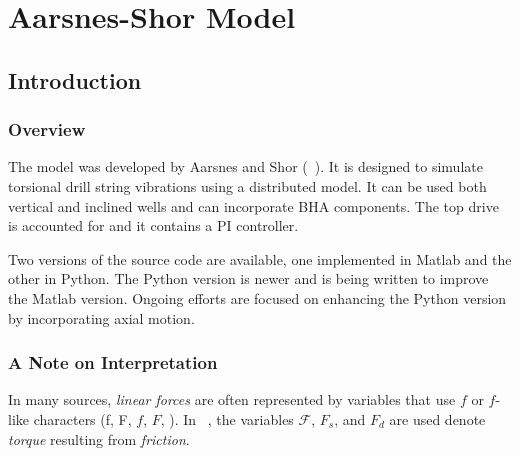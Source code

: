 \chapter{Aarsnes-Shor Model}
\label{ch:aarnessshormodel}

\section{Introduction}
\subsection{Overview}
The model was developed by Aarsnes and Shor (~\cite{ref:aarsnes2017a}). It is designed to simulate torsional drill string vibrations using a distributed model. It can be used both vertical and inclined wells and can incorporate BHA components. The top drive is accounted for and it contains a PI controller.

Two versions of the source code are available, one implemented in Matlab and the other in Python. The Python version is newer and is being written to improve the Matlab version. Ongoing efforts are focused on enhancing the Python version by incorporating axial motion.

\subsection{A Note on Interpretation}
In many sources, \emph{linear forces} are often represented by variables that use $f$ or $f$-like characters (f, F, $f$, $F$, ). In ~\cite{ref:aarsnes2017a}, the variables $\mathcal{F}$, $F_s$, and $F_d$ are used denote \emph{torque} resulting from \emph{friction}.

